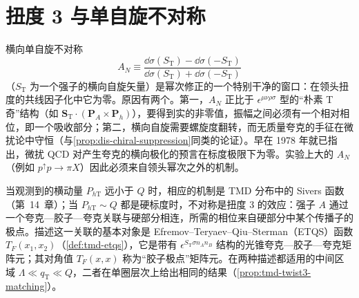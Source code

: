 \section{扭度 3 与单自旋不对称}\label{sec:power-twist3}

横向单自旋不对称
\begin{equation}\label{eq:power-AN}
A_N\equiv\frac{\dd\sigma(S_{\mathrm T})-\dd\sigma(-S_{\mathrm T})}{\dd\sigma(S_{\mathrm T})+\dd\sigma(-S_{\mathrm T})}
\end{equation}
（$S_{\mathrm T}$ 为一个强子的横向自旋矢量）是幂次修正的一个特别干净的窗口：在领头扭度的共线因子化中它为零。原因有两个。第一，$A_N$ 正比于 $\epsilon^{\mu\nu\rho\sigma}$ 型的“朴素 T 奇”结构（如 $\mathbf S_{\mathrm T}\cdot(\mathbf P_A\times\mathbf P_h)$），要得到实的非零值，振幅之间必须有一个相对相位，即一个吸收部分；第二，横向自旋需要螺旋度翻转，而无质量夸克的手征在微扰论中守恒（与\cref{prop:dis-chiral-suppression}同类的论证）。早在 1978 年就已指出，微扰 QCD 对产生夸克的横向极化的预言在标度极限下为零\cite{Kane:1978nd}。实验上大的 $A_N$（例如 $p^\uparrow p\to\pi X$）因此必须来自领头幂次之外的机制。

当观测到的横动量 $P_{h\mathrm T}$ 远小于 $Q$ 时，相应的机制是 TMD 分布中的 Sivers 函数（第~14~章）；当 $P_{h\mathrm T}\sim Q$ 都是硬标度时，不对称是扭度 3 的效应：强子 $A$ 通过一个夸克—胶子—夸克关联与硬部分相连，所需的相位来自硬部分中某个传播子的极点。描述这一关联的基本对象是 Efremov--Teryaev--Qiu--Sterman（ETQS）函数 $T_F(x_1,x_2)$（\cref{def:tmd-etqs}）\cite{Efremov:1981sh,EfremovTeryaev1985,QiuSterman1991c}，它是带有 $\epsilon^{S_{\mathrm T}\sigma n_An_B}$ 结构的光锥夸克—胶子—夸克矩阵元；其对角值 $T_F(x,x)$ 称为“胶子极点”矩阵元。在两种描述都适用的中间区域 $\Lambda\ll q_{\mathrm T}\ll Q$，二者在单圈层次上给出相同的结果\cite{Ji:2006ub}（\cref{prop:tmd-twist3-matching}）。

